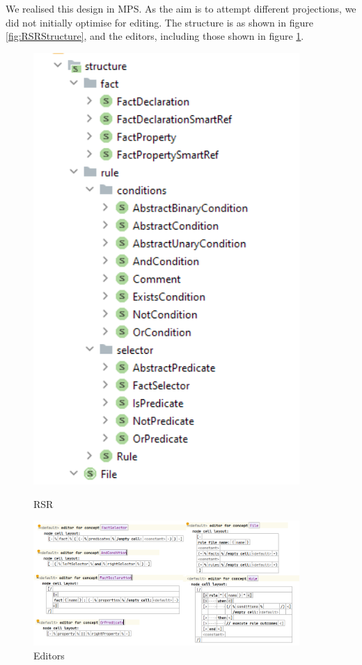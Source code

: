We realised this design in MPS.
As the aim is to attempt different projections, we did not initially optimise for editing.
The structure is as shown in figure \ref{fig:RSRStructure}, and the editors, including those shown in figure \ref{fig:RSREditors}.

\begin{figure}
    \centering
    \begin{minipage}{0.30\textwidth}
        \centering
        \includegraphics[width=0.9\textwidth]{Sections/images/RSRStructrure.png}
        \caption{RSR}
        \label{fig:RSRStructure}
    \end{minipage}\hfill
    \begin{minipage}{0.70\textwidth}
        \centering
        \includegraphics[width=0.9\textwidth]{Sections/images/RSREditors.png} 
        \caption{Editors}
        \label{fig:RSREditors}
    \end{minipage}
\end{figure}

